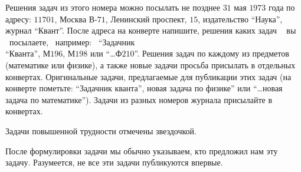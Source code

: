 
% 



\twocolumn
\par
 Решения задач из этого номера можно посылать не позднее $31$ мая $1973$ года по адресу: $11701$, Москва В-$71$, Ленинский проспект, $15$, издательство “Наука”, журнал “Квант”. После адреса на конверте напишите, решения каких задач ~ вы ~посылаете,~ например: ~“Задачник \\ “Кванта”, М$196$, М$198$ или “…Ф$210$”. Решения задач по каждому из предметов (математике или физике), а также новые задачи просьба присылать в отдельных конвертах. Оригинальные задачи, предлагаемые для публикации этих задач (на конверте пометьте: “Задачник кванта”, новая задача по физике” или “…новая задача по математике”). Задачи из разных номеров журнала присылайте в конвертах.
 \par
Задачи повышенной трудности отмечены звездочкой. \par
После формулировки задачи мы обычно указываем, кто предложил нам эту задачу. Разумеется, не все эти задачи публикуются впервые.


